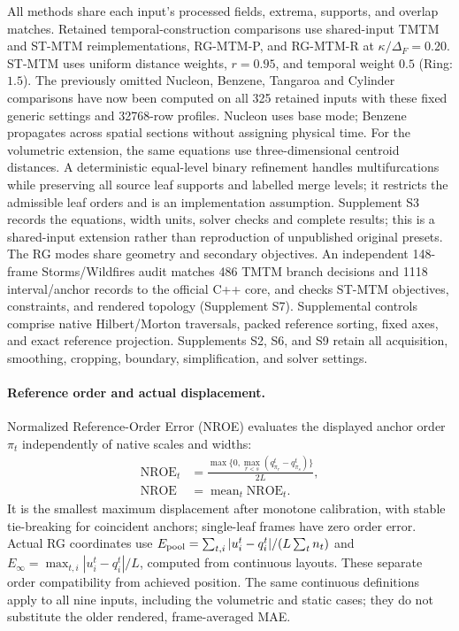 All methods share each input's processed fields, extrema, supports, and overlap matches. Retained temporal-construction comparisons use shared-input TMTM and ST-MTM reimplementations, RG-MTM-P, and RG-MTM-R at $\kappa/\Delta_F=0.20$. ST-MTM uses uniform distance weights, $r=0.95$, and temporal weight $0.5$ (Ring: $1.5$). The previously omitted Nucleon, Benzene, Tangaroa and Cylinder comparisons have now been computed on all 325 retained inputs with these fixed generic settings and 32768-row profiles. Nucleon uses base mode; Benzene propagates across spatial sections without assigning physical time. For the volumetric extension, the same equations use three-dimensional centroid distances. A deterministic equal-level binary refinement handles multifurcations while preserving all source leaf supports and labelled merge levels; it restricts the admissible leaf orders and is an implementation assumption. Supplement S3 records the equations, width units, solver checks and complete results; this is a shared-input extension rather than reproduction of unpublished original presets. The RG modes share geometry and secondary objectives. An independent 148-frame Storms/Wildfires audit matches 486 TMTM branch decisions and 1118 interval/anchor records to the official C++ core, and checks ST-MTM objectives, constraints, and rendered topology (Supplement S7). Supplemental controls comprise native Hilbert/Morton traversals, packed reference sorting, fixed axes, and exact reference projection. Supplements S2, S6, and S9 retain all acquisition, smoothing, cropping, boundary, simplification, and solver settings.



\paragraph{Reference order and actual displacement.}
Normalized Reference-Order Error (NROE) evaluates the displayed anchor order $\pi_t$ independently of native scales and widths:
\begin{equation}
\begin{aligned}
 \mathrm{NROE}_t&=\frac{\max\{0,\max_{r<s}(q_{\pi_r}^t-q_{\pi_s}^t)\}}{2L},\\
 \mathrm{NROE}&=\operatorname{mean}_t\mathrm{NROE}_t .
\end{aligned}\label{eq:order_metric}
\end{equation}
It is the smallest maximum displacement after monotone calibration, with stable tie-breaking for coincident anchors; single-leaf frames have zero order error. Actual RG coordinates use $E_{\rm pool}=\sum_{t,i}|u_i^t-q_i^t|/(L\sum_t n_t)$ and $E_\infty=\max_{t,i}|u_i^t-q_i^t|/L$, computed from continuous layouts. These separate order compatibility from achieved position. The same continuous definitions apply to all nine inputs, including the volumetric and static cases; they do not substitute the older rendered, frame-averaged MAE.

